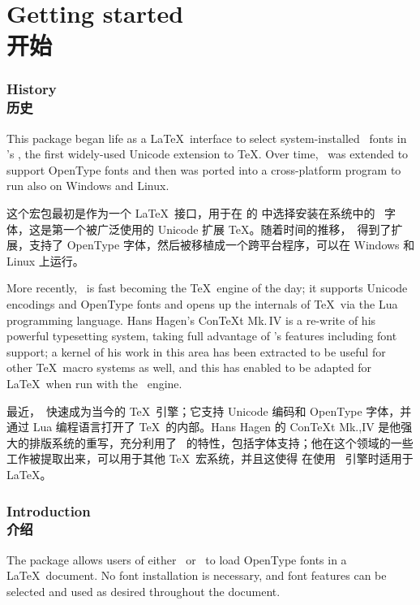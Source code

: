 \documentclass[a4paper]{l3doc}
\begin{document}
\part{Getting started\\开始}

\section{History\\历史}

This package began life as a \LaTeX\ interface to select system-installed
\MacOSX\ fonts in 's \XeTeX, the first widely-used
Unicode extension to \TeX. Over time, \XeTeX\ was extended to support OpenType
fonts and then was ported into a cross-platform program to run also on Windows
and Linux.

这个宏包最初是作为一个 \LaTeX\ 接口，用于在  的 \XeTeX 中选择安装在系统中的 \MacOSX\ 字体，这是第一个被广泛使用的 Unicode 扩展 \TeX。随着时间的推移，\XeTeX\ 得到了扩展，支持了 OpenType 字体，然后被移植成一个跨平台程序，可以在 Windows 和 Linux 上运行。


More recently, \LuaTeX\ is fast becoming the \TeX\ engine of the day; it
supports Unicode encodings and OpenType fonts and opens up the internals of
\TeX\ via the Lua programming language. Hans Hagen's Con\TeX t Mk.\,IV is a
re-write of his powerful typesetting system, taking full advantage of
\LuaTeX's features including font support; a kernel of his work in this area
has been extracted to be useful for other \TeX\ macro systems as well, and
this has enabled  to be adapted for \LaTeX\ when run with the
\LuaTeX\ engine.

最近，\LuaTeX\ 快速成为当今的 \TeX\ 引擎；它支持 Unicode 编码和 OpenType 字体，并通过 Lua 编程语言打开了 \TeX\ 的内部。Hans Hagen 的 Con\TeX t Mk.,IV 是他强大的排版系统的重写，充分利用了 \LuaTeX\ 的特性，包括字体支持；他在这个领域的一些工作被提取出来，可以用于其他 \TeX\ 宏系统，并且这使得  在使用 \LuaTeX\ 引擎时适用于 \LaTeX。

\section{Introduction\\介绍}

The  package allows users of either \XeTeX\ or \LuaTeX\ to
load OpenType fonts in a \LaTeX\ document. No font installation is necessary,
and font features can be selected and used as desired throughout the document.
\end{document}
